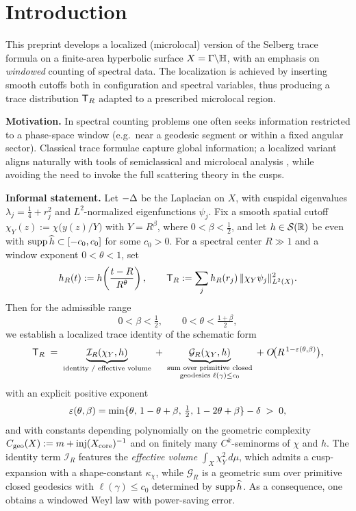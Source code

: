 \section{Introduction}\label{sec:intro}

This preprint develops a localized (microlocal) version of the Selberg trace
formula on a finite-area hyperbolic surface $X=\Gamma\backslash\mathbb{H}$, with an
emphasis on \emph{windowed} counting of spectral data. The localization is
achieved by inserting smooth cutoffs both in configuration and spectral variables,
thus producing a trace distribution $\mathsf{T}_R$ adapted to a prescribed microlocal region.

\smallskip
\noindent\textbf{Motivation.}
In spectral counting problems one often seeks information restricted to a
phase-space window (e.g.\ near a geodesic segment or within a fixed angular sector).
Classical trace formulae \cite{selberg1956,hejhal1976} capture global information;
a localized variant aligns naturally with tools of semiclassical and microlocal
analysis \cite{zworski2012,dyatlovzworski2019}, while avoiding the need to invoke
the full scattering theory in the cusps.

\smallskip
\noindent\textbf{Informal statement.}
Let $-\Delta$ be the Laplacian on $X$, with cuspidal eigenvalues
$\lambda_j=\tfrac14+r_j^2$ and $L^2$-normalized eigenfunctions $\psi_j$.
Fix a smooth spatial cutoff $\chi_Y(z):=\chi\!\big(y(z)/Y\big)$ with $Y=R^\beta$,
where $0<\beta<\tfrac12$, and let $h\in\mathcal{S}(\mathbb{R})$ be even with
$\operatorname{supp}\widehat{h}\subset[-c_0,c_0]$ for some $c_0>0$. For a spectral center
$R\gg1$ and a window exponent $0<\theta<1$, set
\[
  h_R(t):=h\!\left(\frac{t-R}{R^\theta}\right),
  \qquad
  \mathsf{T}_R := \sum_j h_R(r_j)\,\|\chi_Y\psi_j\|_{L^2(X)}^2.
\]
Then for the admissible range
\[
  0<\beta<\tfrac12,
  \qquad
  0<\theta<\tfrac{1+\beta}{2},
\]
we establish a localized trace identity of the schematic form
\[
  \mathsf{T}_R \;=\; \underbrace{\mathcal{I}_R(\chi_Y,h)}_{\text{identity / effective volume}}
  \;+\;
  \underbrace{\mathcal{G}_R(\chi_Y,h)}_{\substack{\text{sum over primitive closed}\\\text{geodesics }\ell(\gamma)\le c_0}}
  \;+\;
  O\!\big(R^{\,1-\varepsilon(\theta,\beta)}\big),
\]
with an explicit positive exponent
\[
  \varepsilon(\theta,\beta)=\min\{\theta,\,1-\theta+\beta,\,\tfrac{1}{2},\,1-2\theta+\beta\}-\delta \;>\; 0,
\]
and with constants depending polynomially on the geometric complexity
$C_{\mathrm{geo}}(X):=m+\mathrm{inj}(X_{\mathrm{core}})^{-1}$ and on finitely many
$C^k$-seminorms of $\chi$ and $h$.
The identity term $\mathcal{I}_R$ features the \emph{effective volume}
$\int_X \chi_Y^2\,d\mu$, which admits a cusp-expansion with a shape-constant
$\kappa_\chi$, while $\mathcal{G}_R$ is a geometric sum over primitive closed
geodesics with $\ell(\gamma)\le c_0$ determined by $\operatorname{supp}\widehat{h}$.
As a consequence, one obtains a windowed Weyl law with power-saving error.

